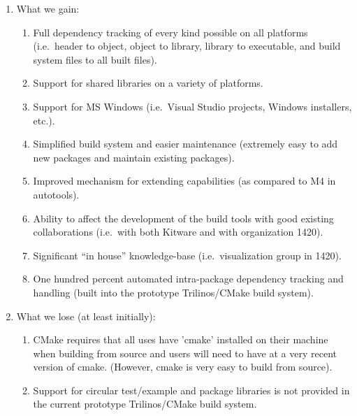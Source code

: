 \documentclass[pdf,ps2pdf,11pt]{SANDreport}
\begin{document}
\begin{enumerate}

{}\item What we gain:

  \begin{enumerate}

  {}\item Full dependency tracking of every kind possible on all
  platforms (i.e.\ header to object, object to library, library to
  executable, and build system files to all built files).

  {}\item Support for shared libraries on a variety of platforms.

  {}\item Support for MS Windows (i.e.\ Visual Studio projects,
  Windows installers, etc.).

  {}\item Simplified build system and easier maintenance (extremely
  easy to add new packages and maintain existing packages).

  {}\item Improved mechanism for extending capabilities (as compared
  to M4 in autotools).

  {}\item Ability to affect the development of the build tools with
  good existing collaborations (i.e.\ with both Kitware and with
  organization 1420).

  {}\item Significant ``in house'' knowledge-base (i.e.\ visualization
  group in 1420).

  {}\item One hundred percent automated intra-package dependency
  tracking and handling (built into the prototype Trilinos/CMake build
  system).

  \end{enumerate}

{}\item What we lose (at least initially):

  \begin{enumerate}

  {}\item CMake requires that all uses have 'cmake' installed on their
  machine when building from source and users will need to have at a
  very recent version of cmake. (However, cmake is very easy to build
  from source).

  {}\item Support for circular test/example and package libraries is
  not provided in the current prototype Trilinos/CMake build system.

  \end{enumerate}

\end{enumerate}
\end{document}
